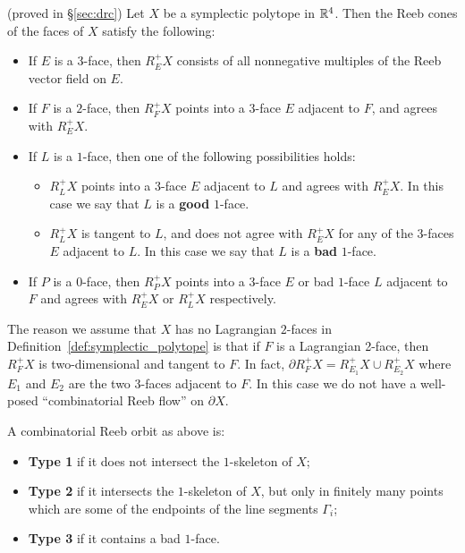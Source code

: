 \begin{lemma}
\label{lem:Reebcone}
(proved in \S\ref{sec:drc})
Let $X$ be a symplectic polytope in ${\mathbb R}^4$. Then the Reeb cones of the faces of $X$ satisfy the following:
\begin{itemize}
\item
If $E$ is a 3-face, then $R_E^+X$ consists of all nonnegative multiples of the Reeb vector field on $E$.
\item If $F$ is a $2$-face, then $R_F^+X$ points into a 3-face $E$ adjacent to $F$, and agrees with $R_E^+X$. 
\item If $L$ is a $1$-face, then one of the following possibilities holds:
\begin{itemize}
\item $R_L^+X$ points into a $3$-face $E$ adjacent to $L$ and agrees with $R_E^+X$. In this case we say that $L$ is a {\bf good\/} $1$-face.
\item $R_L^+X$ is tangent to $L$, and does not agree with $R_E^+X$ for any of the $3$-faces $E$ adjacent to $L$. In this case we say that $L$ is a {\bf bad\/} $1$-face.
\end{itemize}
\item If $P$ is a $0$-face, then $R_P^+X$ points into a $3$-face $E$ or bad $1$-face $L$ adjacent to $F$ and agrees with $R_E^+X$ or $R_L^+X$ respectively.
\end{itemize}
\end{lemma}

\begin{remark}
The reason we assume that $X$ has no Lagrangian $2$-faces in Definition~\ref{def:symplectic_polytope} is that if $F$ is a Lagrangian 2-face, then $R_F^+X$ is two-dimensional and tangent to $F$. In fact, $\partial R_F^+X = R_{E_1}^+X\cup R_{E_2}^+X$ where $E_1$ and $E_2$ are the two $3$-faces adjacent to $F$. In this case we do not have a well-posed ``combinatorial Reeb flow'' on $\partial X$.
\end{remark}

\begin{definition}
A combinatorial Reeb orbit as above is:
\begin{itemize}
\item {\bf Type 1\/} if it does not intersect the $1$-skeleton of $X$;
\item {\bf Type 2\/} if it intersects the $1$-skeleton of $X$, but only in finitely many points which are some of the endpoints of the line segments $\Gamma_i$;
\item {\bf Type 3\/} if it contains a bad $1$-face.
\end{itemize}
\end{definition}

